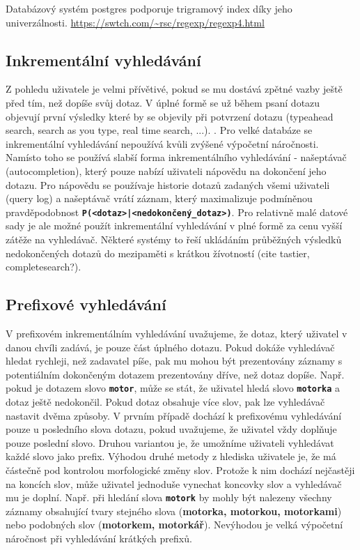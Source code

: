 \documentclass[11pt,letterpaper,oneside,openright]{book}
\newcommand{\bftt}[1]{\texttt{\textbf{#1}}}
\begin{document}

Databázový systém postgres podporuje trigramový index díky jeho univerzálnosti.
\url{https://swtch.com/~rsc/regexp/regexp4.html}


\subsection{Inkrementální vyhledávání}
Z pohledu uživatele je velmi přívětivé, pokud se mu dostává zpětné vazby ještě
před tím, než dopíše svůj dotaz. V úplné formě se už během psaní dotazu
objevují první výsledky které by se objevily při potvrzení dotazu (typeahead
search, search as you type, real time search, ...). . Pro velké databáze se
inkrementální vyhledávání nepoužívá kvůli zvýšené výpočetní náročnosti. Namísto
toho se používá slabší forma inkrementálního vyhledávání - našeptávač
(autocompletion), který pouze nabízí uživateli nápovědu na dokončení jeho
dotazu. Pro nápovědu se používaje historie dotazů zadaných všemi uživateli
(query log) a našeptávač vrátí záznam, který maximalizuje podmíněnou
pravděpodobnost \bftt{P(<dotaz>|<nedokončený\_dotaz>)}. Pro relativně malé datové
sady je ale možné použít inkrementální vyhledávání v plné formě za cenu vyšší
zátěže na vyhledávač. Některé systémy to řeší ukládáním průběžných výsledků
nedokončených dotazů do mezipaměti s krátkou žívotností (cite tastier,
completesearch?).

\subsection{Prefixové vyhledávání}
V prefixovém inkrementálním vyhledávání uvažujeme, že dotaz, který uživatel v
danou chvíli zadává, je pouze část úplného dotazu. Pokud dokáže vyhledávač
hledat rychleji, než zadavatel píše, pak mu mohou být prezentovány záznamy s
potentiálním dokončeným dotazem prezentovány dříve, než dotaz dopíše. Např.
pokud je dotazem slovo \bftt{motor}, může se stát, že uživatel hledá slovo
\bftt{motorka} a dotaz ještě nedokončil. Pokud dotaz obsahuje více slov, pak
lze vyhledávač nastavit dvěma způsoby. V prvním případě dochází k prefixovému
vyhledávání pouze u posledního slova dotazu, pokud uvažujeme, že uživatel vždy
doplňuje pouze poslední slovo. Druhou variantou je, že umožníme uživateli
vyhledávat každé slovo jako prefix. Výhodou druhé metody z hlediska uživatele
je, že má částečně pod kontrolou morfologické změny slov. Protože k nim dochází
nejčastěji na koncích slov, může uživatel jednoduše vynechat koncovky slov a
vyhledávač mu je doplní. Např. při hledání slova \bftt{motork} by mohly být
nalezeny všechny záznamy obsahující tvary stejného slova (\textbf{motorka,
motorkou, motorkami}) nebo podobných slov (\textbf{motorkem, motorkář}).
Nevýhodou je velká výpočetní náročnost při vyhledávání krátkých prefixů.
\end{document}

